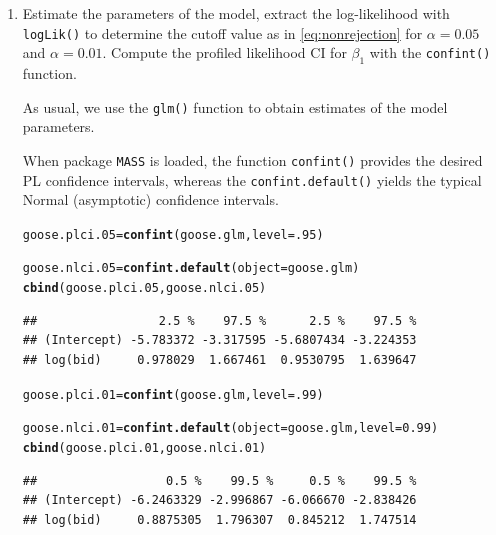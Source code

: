 \documentclass[a4paper,12pt]{article}\usepackage[]{graphicx}\usepackage[]{color}
\makeatletter
\newcommand{\hlnum}[1]{\textcolor[rgb]{0.686,0.059,0.569}{#1}}%
\newcommand{\hlstd}[1]{\textcolor[rgb]{0.345,0.345,0.345}{#1}}%
\newcommand{\hlkwb}[1]{\textcolor[rgb]{0.69,0.353,0.396}{#1}}%
\newcommand{\hlkwc}[1]{\textcolor[rgb]{0.333,0.667,0.333}{#1}}%
\newcommand{\hlkwd}[1]{\textcolor[rgb]{0.737,0.353,0.396}{\textbf{#1}}}%
\newenvironment{kframe}{%
 \def\at@end@of@kframe{}%
 \ifinner\ifhmode%
  \def\at@end@of@kframe{\end{minipage}}%
  \begin{minipage}{\columnwidth}%
 \fi\fi%
 \def\FrameCommand##1{\hskip\@totalleftmargin \hskip-\fboxsep
 \colorbox{shadecolor}{##1}\hskip-\fboxsep
     \hskip-\linewidth \hskip-\@totalleftmargin \hskip\columnwidth}%
 \MakeFramed {\advance\hsize-\width
   \@totalleftmargin\z@ \linewidth\hsize
   \@setminipage}}%
 {\par\unskip\endMakeFramed%
 \at@end@of@kframe}
\newenvironment{knitrout}{}{} %
\makeatother
\begin{document}
%
\begin{enumerate}
    \item Estimate the parameters of the model, extract the log-likelihood with  \texttt{logLik()} to determine the cutoff value as in \eqref{eq:nonrejection} for $\alpha=0.05$ and $\alpha=0.01$. Compute the profiled likelihood CI for $\beta_1$ with the \texttt{confint()} function.

{\color{blue} As usual, we use the \texttt{glm()} function to obtain estimates of the model parameters.}



{\color{blue} When package \texttt{MASS} is loaded, the function \texttt{confint()} provides the desired PL confidence intervals, whereas the \texttt{confint.default()} yields the typical Normal (asymptotic) confidence intervals.}

\begin{knitrout}
\color{fgcolor}\begin{kframe}
\begin{alltt}
\hlstd{goose.plci.05} \hlkwb{=} \hlkwd{confint}\hlstd{(goose.glm,} \hlkwc{level}\hlstd{=}\hlnum{.95}\hlstd{)}
\end{alltt}


{\ttfamily\noindent\itshape\color{messagecolor}{\#\# Waiting for profiling to be done...}}\begin{alltt}
\hlstd{goose.nlci.05} \hlkwb{=} \hlkwd{confint.default}\hlstd{(}\hlkwc{object}\hlstd{=goose.glm)}
\hlkwd{cbind}\hlstd{(goose.plci.05, goose.nlci.05)}
\end{alltt}
\begin{verbatim}
##                 2.5 %    97.5 %      2.5 %    97.5 %
## (Intercept) -5.783372 -3.317595 -5.6807434 -3.224353
## log(bid)     0.978029  1.667461  0.9530795  1.639647
\end{verbatim}
\begin{alltt}
\hlstd{goose.plci.01} \hlkwb{=} \hlkwd{confint}\hlstd{(goose.glm,} \hlkwc{level}\hlstd{=}\hlnum{.99}\hlstd{)}
\end{alltt}


{\ttfamily\noindent\itshape\color{messagecolor}{\#\# Waiting for profiling to be done...}}\begin{alltt}
\hlstd{goose.nlci.01} \hlkwb{=} \hlkwd{confint.default}\hlstd{(}\hlkwc{object}\hlstd{=goose.glm,}\hlkwc{level}\hlstd{=}\hlnum{0.99}\hlstd{)}
\hlkwd{cbind}\hlstd{(goose.plci.01, goose.nlci.01)}
\end{alltt}
\begin{verbatim}
##                  0.5 %    99.5 %     0.5 %    99.5 %
## (Intercept) -6.2463329 -2.996867 -6.066670 -2.838426
## log(bid)     0.8875305  1.796307  0.845212  1.747514
\end{verbatim}
\end{kframe}
\end{knitrout}
    

\end{enumerate}
\end{document}
